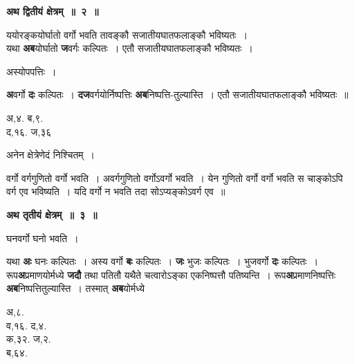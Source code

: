 \documentclass[11pt, openany]{book}
\begin{document}
\begin{center}
\textbf{\large अथ द्वितीयं क्षेत्रम्~॥~२~॥}
\end{center}

{\ab ययोरङ्कयोर्घातो वर्गो भवति तावङ्कौ सजातीयघातफलाङ्कौ भविष्यतः~। }\\

 यथा \textbf{अब}योर्घातो \textbf{ज}वर्गः कल्पितः~। एतौ सजातीयघातफलाङ्कौ भविष्यतः~। 

\begin{center}
अस्योपपत्तिः~।
\end{center}
\vspace{-3mm}

\begin{flushleft}
\begin{minipage}[t]{0.7\textwidth}
\hspace{4mm} \textbf{अ}वर्गो \textbf{दः} कल्पितः~। \textbf{दज}वर्गयोर्निष्पत्तिः \textbf{अब}निष्पत्ति-तुल्यास्ति~। एतौ सजातीयघातफलाङ्कौ भविष्यतः~॥ \\
\end{minipage} 
\hfill
\begin{minipage}[t]{0.2\textwidth}
अ,४. ब,९.\\
द,१६. ज,३६
\end{minipage}
\end{flushleft}
\vspace{-3mm}

अनेन क्षेत्रेणेदं निश्चितम्~।\\
\vspace{-1mm}

वर्गो वर्गगुणितो वर्गो भवति~। अवर्गगुणितो वर्गोऽवर्गो भवति~। येन गुणितो वर्गो वर्गो भवति स चाङ्कोऽपि वर्ग एव भविष्यति~। यदि वर्गो न भवति तदा सोऽप्यङ्कोऽवर्ग एव~॥ 
\vspace{2mm}

\begin{center}
\textbf{\large अथ तृतीयं क्षेत्रम्~॥~३~॥}
\end{center}

{\ab  घनवर्गो घनो भवति~। }

\newpage

\begin{flushleft}
\begin{minipage}[t]{0.75\textwidth}
\hspace{4mm}  यथा \textbf{अः} घनः कल्पितः~। अस्य वर्गो \textbf{बः} कल्पितः~। \textbf{जः} भुजः  कल्पितः~। भुजवर्गो \textbf{दः} कल्पितः~। रूप\textbf{अ}प्रमाणयोर्मध्ये \textbf{जदौ} तथा पतितौ यथैते चत्वारोऽङ्का एकनिष्पत्तौ पतिष्यन्ति~। रूप\textbf{अ}प्रमाणनिष्पत्तिः \textbf{अब}निष्पत्तितुल्यास्ति~। तस्मात् \textbf{अब}योर्मध्ये 
\end{minipage} 
\hfill
\begin{minipage}[t]{0.15\textwidth}
अ,८.\\
व,१६. द,४.\\
क,३२. ज,२. \\
ब,६४.\\
\end{minipage}
\end{flushleft}
\vspace{-7mm}
\end{document}
